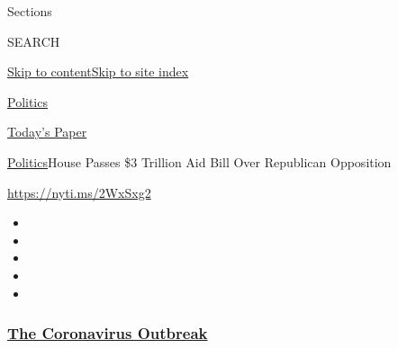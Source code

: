 Sections

SEARCH

\protect\hyperlink{site-content}{Skip to
content}\protect\hyperlink{site-index}{Skip to site index}

\href{https://www.nytimes3xbfgragh.onion/section/politics}{Politics}

\href{https://myaccount.nytimes3xbfgragh.onion/auth/login?response_type=cookie\&client_id=vi}{}

\href{https://www.nytimes3xbfgragh.onion/section/todayspaper}{Today's
Paper}

\href{/section/politics}{Politics}\textbar{}House Passes \$3 Trillion
Aid Bill Over Republican Opposition

\url{https://nyti.ms/2WxSxg2}

\begin{itemize}
\item
\item
\item
\item
\item
\end{itemize}

\hypertarget{the-coronavirus-outbreak}{%
\subsubsection{\texorpdfstring{\href{https://www.nytimes3xbfgragh.onion/news-event/coronavirus?name=styln-coronavirus-national\&region=TOP_BANNER\&block=storyline_menu_recirc\&action=click\&pgtype=Article\&impression_id=90a02a80-efbb-11ea-bdea-9bf7354ffa7c\&variant=undefined}{The
Coronavirus
Outbreak}}{The Coronavirus Outbreak}}\label{the-coronavirus-outbreak}}

